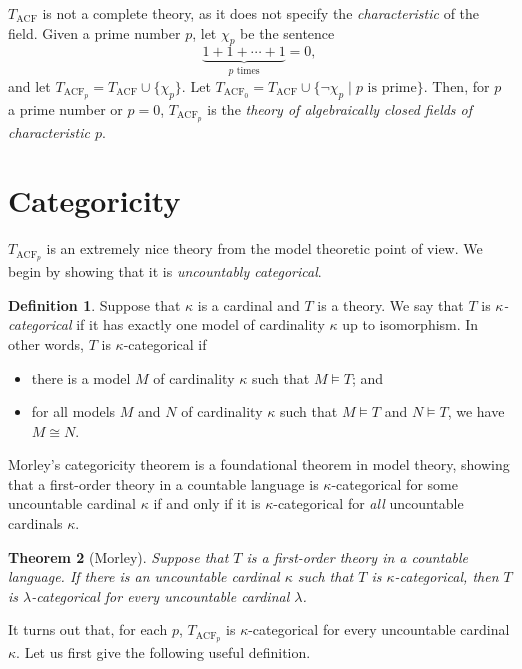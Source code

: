\documentclass[a4paper]{memoir}
\newtheorem{theorem}{Theorem}[section]
\theoremstyle{definition}
\newtheorem{definition}[theorem]{Definition}
\begin{document}
$T_{\mathrm{ACF}}$ is not a complete theory, as it does not specify the 
\emph{characteristic} of the field. Given a prime number $p$, let 
$\chi_p$ be the sentence 
\[
  \underbrace{1 + 1 + \cdots + 1}_{\text{$p$ times}} = 0,
\]
and let $T_{\mathrm{ACF}_p} = T_{\mathrm{ACF}} \cup \{\chi_p\}$. 
Let $T_{\mathrm{ACF}_0} = T_{\mathrm{ACF}} \cup \{\neg \chi_p \mid p 
\text{ is prime}\}$. Then, for $p$ a prime number or $p = 0$, 
$T_{\mathrm{ACF}_p}$ is the \emph{theory of algebraically closed fields 
of characteristic $p$}.

\section{Categoricity}

$T_{\mathrm{ACF}_p}$ is an extremely nice theory from the model theoretic 
point of view. We begin by showing that it is \emph{uncountably categorical}.

\begin{definition}
  Suppose that $\kappa$ is a cardinal and $T$ is a theory. We say 
  that $T$ is \emph{$\kappa$-categorical} if it has exactly one model of 
  cardinality $\kappa$ up to isomorphism. In other words, $T$ is 
  $\kappa$-categorical if
  \begin{itemize}
    \item there is a model $M$ of cardinality $\kappa$ such that 
    $M \models T$; and
    \item for all models $M$ and $N$ of cardinality $\kappa$ such that 
    $M \models T$ and $N \models T$, we have $M \cong N$.
  \end{itemize}
\end{definition}

Morley's categoricity theorem is a foundational theorem in model theory, 
showing that a first-order theory in a countable language is 
$\kappa$-categorical for some 
uncountable cardinal $\kappa$ if and only if it is $\kappa$-categorical 
for \emph{all} uncountable cardinals $\kappa$.

\begin{theorem}[Morley]
  Suppose that $T$ is a first-order theory in a countable language. If 
  there is an uncountable cardinal $\kappa$ such that $T$ is 
  $\kappa$-categorical, then $T$ is $\lambda$-categorical for 
  \emph{every} uncountable cardinal $\lambda$.
\end{theorem}

It turns out that, for each $p$, $T_{\mathrm{ACF}_p}$ is 
$\kappa$-categorical for every uncountable cardinal $\kappa$. Let us first 
give the following useful definition.
\end{document}
